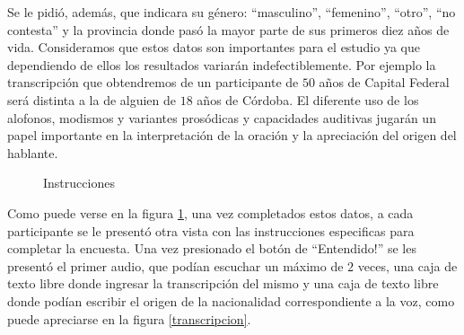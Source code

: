 Se le pidió, además, que indicara su género: ``masculino'', ``femenino'', ``otro'', ``no contesta'' y la provincia donde pasó la mayor parte de sus primeros diez años de vida. Consideramos que estos datos son importantes para el estudio ya que dependiendo de ellos los resultados variarán indefectiblemente. Por ejemplo la transcripción que obtendremos de un participante de $50$ años de Capital Federal será distinta a la de alguien de $18$ años de Córdoba. El diferente uso de los alofonos, modismos y variantes prosódicas y capacidades auditivas jugarán un papel importante en la interpretación de la oración y la apreciación del origen del hablante.

\begin{figure}
\begin{center}
\end{center}
\caption{Instrucciones}
\label{instrucciones}
\end{figure}

Como puede verse en la figura \ref{instrucciones}, una vez completados estos datos, a cada participante se le presentó otra vista con las instrucciones especificas para completar la encuesta. Una vez presionado el botón de ``Entendido!'' se les presentó el primer audio, que podían escuchar un máximo de $2$ veces, una caja de texto libre donde ingresar la transcripción del mismo y una caja de texto libre donde podían escribir el origen de la nacionalidad correspondiente a la voz, como puede apreciarse en la figura \ref{transcripcion}.

